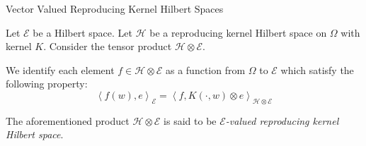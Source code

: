 \documentclass{beamer}
\newcommand{\T}{\mathbb T}
\newcommand{\calE}{{\mathcal E}}
\newcommand{\calH}{{\mathcal H}}
\newcommand{\ip}[1]{\left\langle #1 \right\rangle}
\begin{document}


\begin{frame}{Vector Valued Reproducing Kernel Hilbert Spaces}
\begin{definition}
Let $\calE$ be a Hilbert space. Let $\calH$ be a reproducing kernel Hilbert space on $\Omega$ with kernel $K$. Consider the tensor product $\calH \otimes \calE$.
\pause

We identify each element $f\in \calH \otimes \calE$ as a function from $\Omega$ to $\calE$ which satisfy the following property:
\begin{equation*}
\ip{f(w), e}_{\calE} = \ip{f, K(\cdot, w) \otimes e}_{\calH \otimes \calE}
\end{equation*}
\pause

The aforementioned product $\calH \otimes \calE$ is said to be \textit{$\calE$-valued reproducing kernel Hilbert space}.
\end{definition}

\end{frame}
\end{document}
